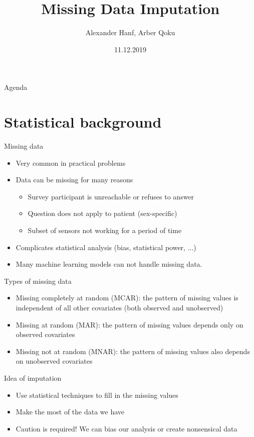 \documentclass[aspectratio=43]{beamer}
\title{Missing Data Imputation}
\date{11.12.2019}
\author{Alexander Hanf, Arber Qoku}
\begin{document}
%
\maketitle

\begin{frame}{Agenda}
\tableofcontents
\end{frame}

\section{Statistical background}

\begin{frame}{Missing data}
\begin{itemize}
\item Very common in practical problems
\item Data can be missing for many reasons
\begin{itemize}
\item Survey participant is unreachable or refuses to answer
\item Question does not apply to patient (sex-specific)
\item Subset of sensors not working for a period of time
\end{itemize}
\item Complicates statistical analysis (bias, statistical power, ...)
\item Many machine learning models can not handle missing data.
\end{itemize}
\end{frame}

\begin{frame}{Types of missing data}
\begin{itemize}
\item Missing completely at random (MCAR): the pattern of missing values is independent of all other covariates (both observed and unobserved)
\item Missing at random (MAR): the pattern of missing values depends only on observed covariates
\item Missing not at random (MNAR): the pattern of missing values also depends on unobserved covariates
\end{itemize}
\end{frame}

\begin{frame}{Idea of imputation}
\begin{itemize}
\item Use statistical techniques to fill in the missing values
\item Make the most of the data we have
\item Caution is required! We can bias our analysis or create nonsensical data
\end{itemize}
\end{frame}
\end{document}

